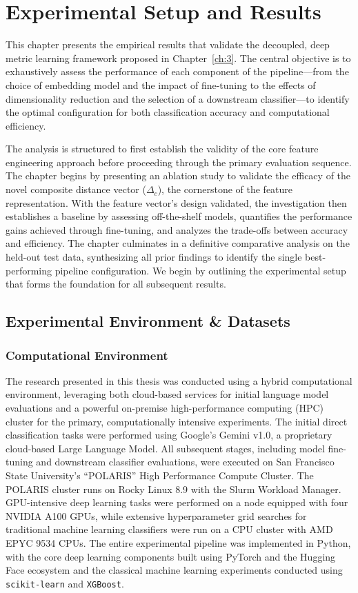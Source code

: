 \chapter{Experimental Setup and Results}\label{ch:4}
This chapter presents the empirical results that validate the decoupled, deep metric learning framework proposed in Chapter~\ref{ch:3}. The central objective is to exhaustively assess the performance of each component of the pipeline---from the choice of embedding model and the impact of fine-tuning to the effects of dimensionality reduction and the selection of a downstream classifier---to identify the optimal configuration for both classification accuracy and computational efficiency.

The analysis is structured to first establish the validity of the core feature engineering approach before proceeding through the primary evaluation sequence. The chapter begins by presenting an ablation study to validate the efficacy of the novel composite distance vector (\(\Delta_c\)), the cornerstone of the feature representation. With the feature vector's design validated, the investigation then establishes a baseline by assessing off-the-shelf models, quantifies the performance gains achieved through fine-tuning, and analyzes the trade-offs between accuracy and efficiency. The chapter culminates in a definitive comparative analysis on the held-out test data, synthesizing all prior findings to identify the single best-performing pipeline configuration. We begin by outlining the experimental setup that forms the foundation for all subsequent results.

\section{Experimental Environment \& Datasets}\label{ch:4.1}

\subsection{Computational Environment}\label{ch:4.1.1}
The research presented in this thesis was conducted using a hybrid computational environment, leveraging both cloud-based services for initial language model evaluations and a powerful on-premise high-performance computing (HPC) cluster for the primary, computationally intensive experiments. The initial direct classification tasks were performed using Google's Gemini v1.0, a proprietary cloud-based Large Language Model. All subsequent stages, including model fine-tuning and downstream classifier evaluations, were executed on San Francisco State University's ``POLARIS'' High Performance Compute Cluster. The POLARIS cluster runs on Rocky Linux 8.9 with the Slurm Workload Manager. GPU-intensive deep learning tasks were performed on a node equipped with four NVIDIA A100 GPUs, while extensive hyperparameter grid searches for traditional machine learning classifiers were run on a CPU cluster with AMD EPYC 9534 CPUs. The entire experimental pipeline was implemented in Python, with the core deep learning components built using PyTorch and the Hugging Face ecosystem and the classical machine learning experiments conducted using \verb|scikit-learn| and \verb|XGBoost|.

